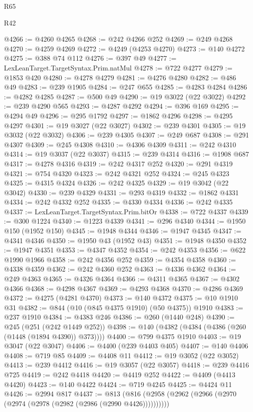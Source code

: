 \begin{lexlean}{R65}
\begin{lexlean}{R42}
\begin{coremodule}
{{{{{{{{{{{{{{{{{{{{{{{{{{{{{{{{{{{{{{{{{{{{{{{{{{{{{{{{{{{{{{{{{{{{{{{{{{{{{{{{{{{{{{{{{{{{{{{{{{{{{{{{{{{{{{{{{{{{{{{{{{{{{{{{{{{{{{{{{{{{{{{{{{{{{{{{{{{{{{{{{{{{{{{{{{{{{{{{{{{{{{{{@4266 := @4260 @4265
@4268 := @242 @4266 @252
@4269 := @249 @4268
@4270 := @4259 @4269
@4272 := @4249 (@4253 @4270)
@4273 := @140 @4272
@4275 := @388 @74 @112
@4276 := @397 @49
@4277 := LexLeanTarget.TargetSyntax.Prim.natMul
@4278 := @722 @4277
@4279 := @1853 @420
@4280 := @4278 @4279
@4281 := @4276 @4280
@4282 := @486 @49
@4283 := @239 @1905
@4284 := @247 @655
@4285 := @4283 @4284
@4286 := @4282 @4285
@4287 := @500 @49
@4290 := @19 @3022 (@22 @3022)
@4292 := @239 @4290 @565
@4293 := @4287 @4292
@4294 := @396 @169
@4295 := @4294 @49
@4296 := @295 @1792
@4297 := @1862 @4296
@4298 := @4295 @4297
@4301 := @19 @3027 (@22 @3027)
@4302 := @239 @4301
@4305 := @19 @3032 (@22 @3032)
@4306 := @239 @4305
@4307 := @249 @687
@4308 := @291 @4307
@4309 := @245 @4308
@4310 := @4306 @4309
@4311 := @242 @4310
@4314 := @19 @3037 (@22 @3037)
@4315 := @239 @4314
@4316 := @1908 @687
@4317 := @4278 @4316
@4319 := @242 @4317 @252
@4320 := @291 @4319
@4321 := @754 @4320
@4323 := @242 @4321 @252
@4324 := @245 @4323
@4325 := @4315 @4324
@4326 := @242 @4325
@4329 := @19 @3042 (@22 @3042)
@4330 := @239 @4329
@4331 := @293 @4319
@4332 := @1862 @4331
@4334 := @242 @4332 @252
@4335 := @4330 @4334
@4336 := @242 @4335
@4337 := LexLeanTarget.TargetSyntax.Prim.bitOr
@4338 := @722 @4337
@4339 := @300 @1224
@4340 := @1223 @4339
@4341 := @296 @4340
@4344 := @1950 @150 (@1952 @150)
@4345 := @1948 @4344
@4346 := @1947 @4345
@4347 := @4341 @4346
@4350 := @1950 @43 (@1952 @43)
@4351 := @1948 @4350
@4352 := @1947 @4351
@4353 := @4347 @4352
@4354 := @242 @4353
@4356 := @622 @1990 @1966
@4358 := @242 @4356 @252
@4359 := @4354 @4358
@4360 := @4338 @4359
@4362 := @242 @4360 @252
@4363 := @4336 @4362
@4364 := @249 @4363
@4365 := @4326 @4364
@4366 := @4311 @4365
@4367 := @4302 @4366
@4368 := @4298 @4367
@4369 := @4293 @4368
@4370 := @4286 @4369
@4372 := @4275 (@4281 @4370)
@4373 := @140 @4372
@4375 := @10 @1910 @31
@4382 := @844 (@10 (@845 @4375 @1910) (@50 @4375)) @1910
@4383 := @237 @1910
@4384 := @4383 @246
@4386 := @260 (@1440 @248)
@4390 := @245 (@251 (@242 @1449 @252))
@4398 := @140 (@4382 (@4384 (@4386 (@260 (@1448 (@1894 @4390)) @373))))
@4400 := @799 @4375 @1910
@4403 := @19 @3047 (@22 @3047)
@4406 := @4400 (@239 @4403 @405)
@4407 := @140 @4406
@4408 := @719 @85
@4409 := @4408 @11
@4412 := @19 @3052 (@22 @3052)
@4413 := @239 @4412
@4416 := @19 @3057 (@22 @3057)
@4418 := @239 @4416 @725
@4419 := @242 @4418
@4420 := @4419 @252
@4422 := @4409 (@4413 @4420)
@4423 := @140 @4422
@4424 := @719 @4245
@4425 := @4424 @11
@4426 := @2994 @817
@4437 := @813 (@816 (@2958 (@2962 (@2966 (@2970 (@2974 (@2978 (@2982 (@2986 (@2990 @4426))))))))))
}}}}}}}}}}}}}}}}}}}}}}}}}}}}}}}}}}}}}}}}}}}}}}}}}}}}}}}}}}}}}}}}}}}}}}}}}}}}}}}}}}}}}}}}}}}}}}}}}}}}}}}}}}}}}}}}}}}}}}}}}}}}}}}}}}}}}}}}}}}}}}}}}}}}}}}}}}}}}}}}}}}}}}}}}}}}}}}}}}}}}}}}
\end{coremodule}
\end{lexlean}
\end{lexlean}
